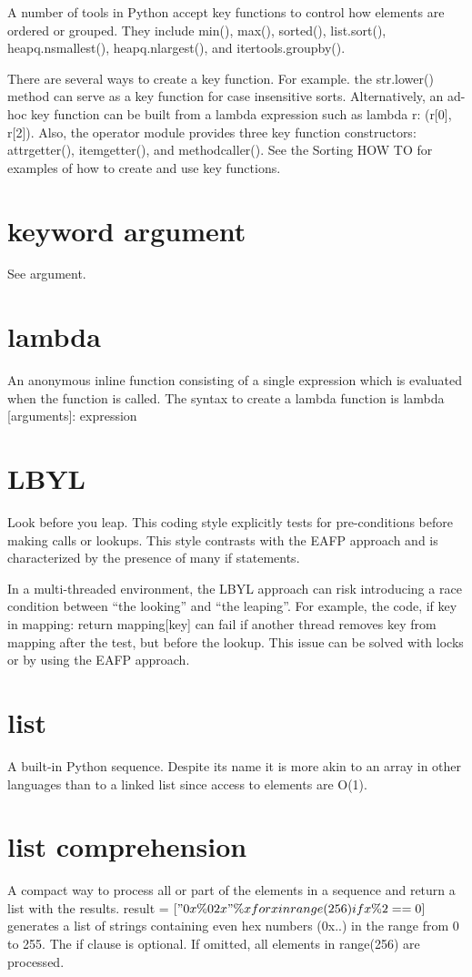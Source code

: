 \documentclass[12pt,a4paper,final,twoside,onecolumn,titlepage]{book}
\begin{document}
A number of tools in Python accept key functions to control how elements are ordered or grouped. They include min(), max(), sorted(), list.sort(), heapq.nsmallest(), heapq.nlargest(), and itertools.groupby().

There are several ways to create a key function. For example. the str.lower() method can serve as a key function for case insensitive sorts. Alternatively, an ad-hoc key function can be built from a lambda expression such as lambda r: (r[0], r[2]). Also, the operator module provides three key function constructors: attrgetter(), itemgetter(), and methodcaller(). See the Sorting HOW TO for examples of how to create and use key functions.

\section{keyword argument}
See argument.

\section{lambda}
An anonymous inline function consisting of a single expression which is evaluated when the function is called. The syntax to create a lambda function is lambda [arguments]: expression
\section{LBYL}
Look before you leap. This coding style explicitly tests for pre-conditions before making calls or lookups. This style contrasts with the EAFP approach and is characterized by the presence of many if statements.

In a multi-threaded environment, the LBYL approach can risk introducing a race condition between “the looking” and “the leaping”. For example, the code, if key in mapping: return mapping[key] can fail if another thread removes key from mapping after the test, but before the lookup. This issue can be solved with locks or by using the EAFP approach.

\section{list}
A built-in Python sequence. Despite its name it is more akin to an array in other languages than to a linked list since access to elements are O(1).

\section{list comprehension}
A compact way to process all or part of the elements in a sequence and return a list with the results. result = $["0x\%02x" \% x for x in range(256) if x \% 2 == 0]$ generates a list of strings containing even hex numbers (0x..) in the range from 0 to 255. The if clause is optional. If omitted, all elements in range(256) are processed.
\end{document}
